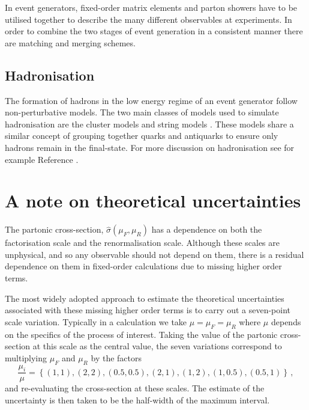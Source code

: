 \documentclass[main.tex]{subfiles}
\begin{document}
    In event generators, fixed-order matrix elements
    and parton showers have to be utilised together to describe
    the many different observables at experiments. In order
    to combine the two stages of event generation in a consistent
    manner there are matching \cite{Frixione:2002ik,Frixione:2007vw,Jadach:2015mza}
    and merging \cite{Catani:2001cc,Lonnblad:2011xx}
    schemes.

    \subsection*{Hadronisation}\label{sec:hadronisation}
    The formation of hadrons in the low energy regime
    of an event generator follow non-perturbative models.
    The two main classes of models used to simulate
    hadronisation are the cluster models \cite{Webber:1983if,Winter:2003tt}
    and string models \cite{Andersson:1983ia}.
    These models share a similar concept of grouping together
    quarks and antiquarks to ensure only hadrons remain
    in the final-state. For more discussion on hadronisation
    see for example Reference \cite{Webber:1999ui}.

    \section{A note on theoretical uncertainties}\label{sec:scale_variations}
    The partonic cross-section, $\hat{\sigma}(\mu_{F}, \mu_{R})$ has
    a dependence on both the factorisation scale and the
    renormalisation scale. Although these scales are unphysical,
    and so any observable should not depend on them,
    there is a residual dependence on them in fixed-order
    calculations due to missing higher order terms.

    The most widely adopted approach to estimate the
    theoretical uncertainties associated with these
    missing higher order terms is to carry out a seven-point
    scale variation. Typically in a calculation we take
    $\mu = \mu_{F} = \mu_{R}$ where $\mu$ depends on the specifics
    of the process of interest. Taking the value of the
    partonic cross-section at this scale as the central value,
    the seven variations correspond to multiplying $\mu_{F}$
    and $\mu_{R}$ by the factors 
    \begin{equation}\label{eqn:scale_variations}
        \dfrac{\mu_{i}}{\mu} = \left\{(1, 1), (2,2),(0.5,0.5),(2,1),(1,2),(1,0.5),(0.5,1)\right\} \, ,
    \end{equation}
    and re-evaluating the
    cross-section at these scales.
    The estimate of the uncertainty is then taken
    to be the half-width of the maximum interval.
\end{document}
